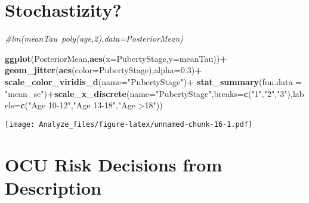 \documentclass[]{article}
\newenvironment{Shaded}{\begin{snugshade}}{\end{snugshade}}
\newcommand{\KeywordTok}[1]{\textcolor[rgb]{0.13,0.29,0.53}{\textbf{#1}}}
\newcommand{\DataTypeTok}[1]{\textcolor[rgb]{0.13,0.29,0.53}{#1}}
\newcommand{\FloatTok}[1]{\textcolor[rgb]{0.00,0.00,0.81}{#1}}
\newcommand{\StringTok}[1]{\textcolor[rgb]{0.31,0.60,0.02}{#1}}
\newcommand{\CommentTok}[1]{\textcolor[rgb]{0.56,0.35,0.01}{\textit{#1}}}
\newcommand{\OperatorTok}[1]{\textcolor[rgb]{0.81,0.36,0.00}{\textbf{#1}}}
\newcommand{\NormalTok}[1]{#1}
\begin{document}
\section{Stochastizity?}\label{stochastizity}

\begin{Shaded}
\begin{Highlighting}[]
\CommentTok{#lm(meanTau~poly(age,2),data=PosteriorMean)}

\KeywordTok{ggplot}\NormalTok{(PosteriorMean,}\KeywordTok{aes}\NormalTok{(}\DataTypeTok{x=}\NormalTok{PubertyStage,}\DataTypeTok{y=}\NormalTok{meanTau))}\OperatorTok{+}
\StringTok{  }\KeywordTok{geom_jitter}\NormalTok{(}\KeywordTok{aes}\NormalTok{(}\DataTypeTok{color=}\NormalTok{PubertyStage),}\DataTypeTok{alpha=}\FloatTok{0.3}\NormalTok{)}\OperatorTok{+}
\StringTok{  }\KeywordTok{scale_color_viridis_d}\NormalTok{(}\DataTypeTok{name=}\StringTok{"PubertyStage"}\NormalTok{)}\OperatorTok{+}
\StringTok{  }\KeywordTok{stat_summary}\NormalTok{(}\DataTypeTok{fun.data =} \StringTok{"mean_se"}\NormalTok{)}\OperatorTok{+}\KeywordTok{scale_x_discrete}\NormalTok{(}\DataTypeTok{name=}\StringTok{"PubertyStage"}\NormalTok{,}\DataTypeTok{breaks=}\KeywordTok{c}\NormalTok{(}\StringTok{"1"}\NormalTok{,}\StringTok{"2"}\NormalTok{,}\StringTok{"3"}\NormalTok{),}\DataTypeTok{labels=}\KeywordTok{c}\NormalTok{(}\StringTok{"Age 10-12"}\NormalTok{,}\StringTok{"Age 13-18"}\NormalTok{,}\StringTok{"Age >18"}\NormalTok{))}
\end{Highlighting}
\end{Shaded}

\texttt{[image: Analyze\_files/figure-latex/unnamed-chunk-16-1.pdf]}

\section{OCU Risk Decisions from
Description}\label{ocu-risk-decisions-from-description}
\end{document}
